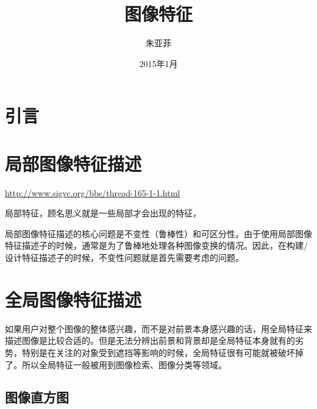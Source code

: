 \documentclass[12pt]{article}
\begin{document}
\title{\vspace{-2em}图像特征\vspace{-0.7em}}
\author{朱亚菲}
\date{\vspace{-0.7em}2015年1月\vspace{-0.7em}}
\maketitle\thispagestyle{fancy}
\maketitle
\tableofcontents 


\section{引言}

\section{局部图像特征描述}

\url{http://www.sigvc.org/bbs/thread-165-1-1.html}

局部特征，顾名思义就是一些局部才会出现的特征，

局部图像特征描述的核心问题是不变性（鲁棒性）和可区分性。由于使用局部图像特征描述子的时候，通常是为了鲁棒地处理各种图像变换的情况。因此，在构建/设计特征描述子的时候，不变性问题就是首先需要考虑的问题。

\section{全局图像特征描述}

如果用户对整个图像的整体感兴趣，而不是对前景本身感兴趣的话，用全局特征来描述图像是比较合适的。但是无法分辨出前景和背景却是全局特征本身就有的劣势，特别是在关注的对象受到遮挡等影响的时候，全局特征很有可能就被破坏掉了。所以全局特征一般被用到图像检索、图像分类等领域。

\subsection{图像直方图}
\end{document}
